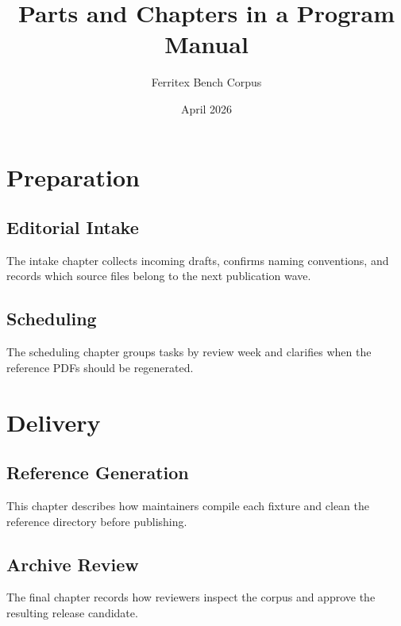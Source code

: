 \documentclass{book}
\title{Parts and Chapters in a Program Manual}
\author{Ferritex Bench Corpus}
\date{April 2026}
\begin{document}
\maketitle
\tableofcontents

\part{Preparation}
\chapter{Editorial Intake}
The intake chapter collects incoming drafts, confirms naming conventions,
and records which source files belong to the next publication wave.

\chapter{Scheduling}
The scheduling chapter groups tasks by review week and clarifies when the
reference PDFs should be regenerated.

\part{Delivery}
\chapter{Reference Generation}
This chapter describes how maintainers compile each fixture and clean the
reference directory before publishing.

\chapter{Archive Review}
The final chapter records how reviewers inspect the corpus and approve the
resulting release candidate.
\end{document}

